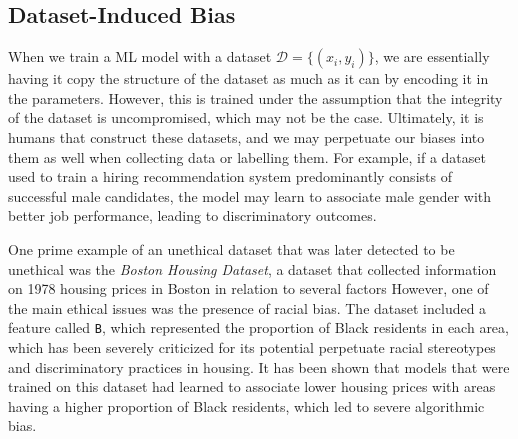 \documentclass[10pt]{article}
\begin{document}
  \subsection{Dataset-Induced Bias}

    When we train a ML model with a dataset $\mathcal{D} = \{(x_i, y_i)\}$, we are essentially having it copy the structure of the dataset as much as it can by encoding it in the parameters. However, this is trained under the assumption that the integrity of the dataset is uncompromised, which may not be the case. Ultimately, it is humans that construct these datasets, and we may perpetuate our biases into them as well when collecting data or labelling them. For example, if a dataset used to train a hiring recommendation system predominantly consists of successful male candidates, the model may learn to associate male gender with better job performance, leading to discriminatory outcomes. 

    One prime example of an unethical dataset that was later detected to be unethical was the \textit{Boston Housing Dataset}, a dataset that collected information on 1978 housing prices in Boston in relation to several factors \cite{boston} However, one of the main ethical issues was the presence of racial bias. The dataset included a feature called \texttt{B}, which represented the proportion of Black residents in each area, which has been severely criticized for its potential perpetuate racial stereotypes and discriminatory practices in housing. It has been shown that models that were trained on this dataset had learned to associate lower housing prices with areas having a higher proportion of Black residents, which led to severe algorithmic bias. 
\end{document}
